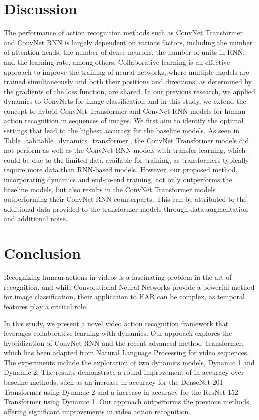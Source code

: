 \documentclass[fleqn,10pt]{wlscirep}
\begin{document}
\section{Discussion}
\label{sec:discussion}


The performance of action recognition methods such as ConvNet Transformer and ConvNet RNN is largely dependent on various factors, including the number of attention heads, the number of dense neurons, the number of units in RNN, and the learning rate, among others. Collaborative learning is an effective approach to improve the training of neural networks, where multiple models are trained simultaneously and both their positions and directions, as determined by the gradients of the loss function, are shared. In our previous research, we applied dynamics to ConvNets for image classification and in this study, we extend the concept to hybrid ConvNet Transformer and ConvNet RNN models for human action recognition in sequences of images. We first aim to identify the optimal settings that lead to the highest accuracy for the baseline models. As seen in Table~\ref{tab:table_dynamics_transformer}, the ConvNet Transformer models did not perform as well as the ConvNet RNN models with transfer learning, which could be due to the limited data available for training, as transformers typically require more data than RNN-based models. However, our proposed method, incorporating dynamics and end-to-end training, not only outperforms the baseline models, but also results in the ConvNet Transformer models outperforming their ConvNet RNN counterparts. This can be attributed to the additional data provided to the transformer models through data augmentation and additional noise.

\section{Conclusion}
\label{sec:conclusion}
Recognizing human actions in videos is a fascinating problem in the art of recognition, and while Convolutional Neural Networks provide a powerful method for image classification, their application to HAR can be complex, as temporal features play a critical role.

In this study, we present a novel video action recognition framework that leverages collaborative learning with dynamics. Our approach explores the hybridization of ConvNet RNN and the recent advanced method Transformer, which has been adapted from Natural Language Processing for video sequences. The experiments include the exploration of two dynamics models, Dynamic 1 and Dynamic 2. The results demonstrate a round improvement of  in accuracy over baseline methods, such as an  increase in accuracy for the DenseNet-201 Transformer using Dynamic 2 and a  increase in accuracy for the ResNet-152 Transformer using Dynamic 1. Our approach outperforms the previous methods, offering significant improvements in video action recognition. 
\end{document}
